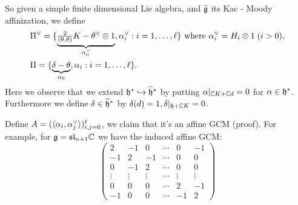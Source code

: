 \begin{itemize}
    So given a simple finite dimensional Lie algebra, and $\widetilde{\mathfrak{g}}$ its Kac - Moody affinization, we define 
    \begin{equation}
        \begin{aligned}
            &\Pi^\vee =\{\underset{\alpha^{\vee}_0}{\underbrace{\tfrac{2}{(\theta,\theta)}K - \theta^\vee\otimes1}},
            \alpha^{\vee}_i: i =1,\dots,\ell\}\text{ where }\alpha^{\vee}_i=H_i\otimes1\;(i>0),\\
            &\Pi=\{\underset{\alpha_0}{\underbrace{\delta - \theta}},\alpha_i:i=1,\dots,\ell\}.
        \end{aligned}
    \end{equation}
    Here we observe that we extend $\mathfrak{h}^* \hookrightarrow \widetilde{\mathfrak{h}}^*$ by putting $\alpha|_{\mathbb{C} K+\mathbb{C} d} = 0$ for 
    $\alpha\in\mathfrak{h}^*$. Furthermore we define $\delta\in\widetilde{\mathfrak{h}}^*$ by $\delta(d) = 1,\delta|_{\mathfrak{h}+\mathbb{C} K}=0$.\par 

    Define $A = (\langle\alpha_i,\alpha^{\vee}_j\rangle)_{i,j=0}^\ell$, we claim that it's an affine GCM (\TODO proof). For example, 
    for $\mathfrak{g} = \mathfrak{sl}_{n+1}\mathbb{C}$ we have the induced affine GCM:
    \begin{equation}
        \begin{pmatrix}
            2&-1&0&\cdots&0&-1\\
            -1&2&-1&\cdots&0&0\\
            0&-1&2&\cdots&0&0\\
            \vdots&\vdots&\vdots&\cdots&\vdots&\vdots\\
            0&0&0&\cdots&2&-1\\
            -1&0&0&\cdots&-1&2
        \end{pmatrix}
    \end{equation}
    

\end{itemize}
